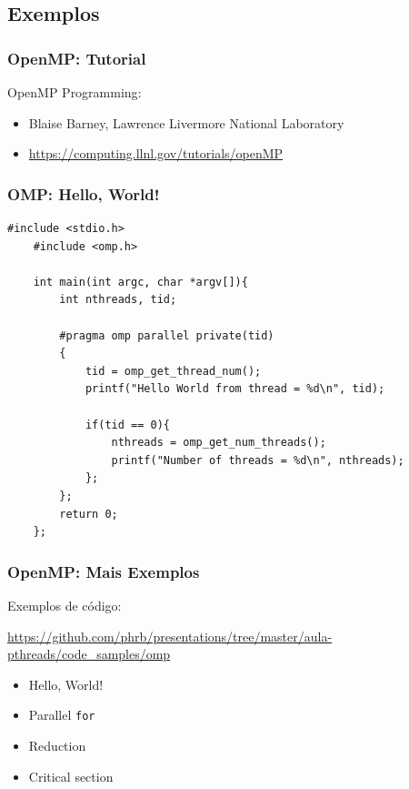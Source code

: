 \documentclass[10pt, compress, aspectratio=169, xcolor={table,usenames,dvipsnames}]{beamer}
\begin{document}
\subsection{Exemplos}

\begin{frame}
    \frametitle{OpenMP: Tutorial}
    \alert{OpenMP Programming}:
    \begin{itemize}
        \item Blaise Barney, Lawrence Livermore National Laboratory
        \item \url{https://computing.llnl.gov/tutorials/openMP}
    \end{itemize}
\end{frame}

\begin{frame}[fragile]
    \frametitle{OMP: Hello, World!}
    \begin{adjustbox}{width=.65\textwidth,center}
    \begin{lstlisting}[basicstyle=\ttfamily\scriptsize]
    #include <stdio.h>
    #include <omp.h>

    int main(int argc, char *argv[]){
        int nthreads, tid;

        #pragma omp parallel private(tid)
        {
            tid = omp_get_thread_num();
            printf("Hello World from thread = %d\n", tid);

            if(tid == 0){
                nthreads = omp_get_num_threads();
                printf("Number of threads = %d\n", nthreads);
            };
        };
        return 0;
    };
    \end{lstlisting}
    \end{adjustbox}
\end{frame}

\begin{frame}
    \frametitle{OpenMP: Mais Exemplos}
    Exemplos de código:

    {\scriptsize\url{https://github.com/phrb/presentations/tree/master/aula-pthreads/code_samples/omp}}
    \begin{itemize}
        \item Hello, World!
        \item Parallel \texttt{for}
        \item Reduction
        \item Critical section
    \end{itemize}
\end{frame}

%

\maketitle
\end{document}
